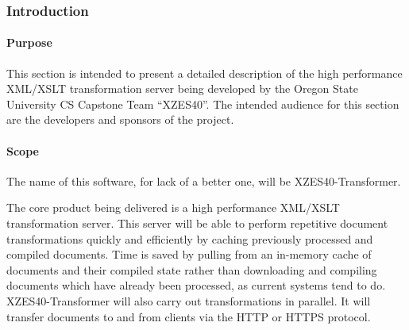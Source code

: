 \subsubsection{Introduction}

\paragraph{Purpose}

This section is intended to present a detailed description of the high performance XML/XSLT transformation server being developed by the Oregon State University CS Capstone Team ``XZES40''.
The intended audience for this section are the developers and sponsors of the project.


\paragraph{Scope}

The name of this software, for lack of a better one, will be XZES40-Transformer.

The core product being delivered is a high performance XML/XSLT transformation server.
This server will be able to perform repetitive document transformations quickly and efficiently by caching previously processed and compiled documents.
Time is saved by pulling from an in-memory cache of documents and their compiled state rather than downloading and compiling documents which have already been processed, as current systems tend to do.
XZES40-Transformer will also carry out transformations in parallel.
It will transfer documents to and from clients via the HTTP or HTTPS protocol.

